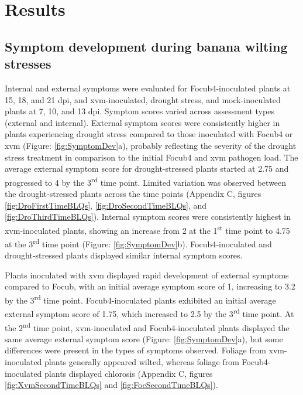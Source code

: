 \newpage
\section{Results}

\subsection{Symptom development during banana wilting stresses}

Internal and external symptoms were evaluated for \ac{Focub4}-inoculated plants at 15, 18, and 21 \ac{dpi}, and \ac{xvm}-inoculated, drought stress, and mock-inoculated plants at 7, 10, and 13 \ac{dpi}. Symptom scores varied across assessment types (external and internal). External symptom scores were consistently higher in plants experiencing drought stress compared to those inoculated with \ac{Focub4} or \ac{xvm} (Figure: \ref{fig:SymptomDev}a), probably reflecting the severity of the drought stress treatment in comparison to the initial \ac{Focub4} and \ac{xvm} pathogen load. The average external symptom score for drought-stressed plants started at 2.75 and progressed to 4 by the 3\textsuperscript{rd} time point. Limited variation was observed between the drought-stressed plants across the time points (Appendix C, figures \ref{fig:DroFirstTimeBLQs}, \ref{fig:DroSecondTimeBLQs}, and \ref{fig:DroThirdTimeBLQs}). Internal symptom scores were consistently highest in \ac{xvm}-inoculated plants, showing an increase from 2 at the 1\textsuperscript{st} time point to 4.75 at the 3\textsuperscript{rd} time point (Figure: \ref{fig:SymptomDev}b). \Ac{Focub4}-inoculated and drought-stressed plants displayed similar internal symptom scores.

Plants inoculated with \ac{xvm} displayed rapid development of external symptoms compared to \ac{Focub}, with an initial average symptom score of 1, increasing to 3.2 by the 3\textsuperscript{rd} time point. \ac{Focub4}-inoculated plants exhibited an initial average external symptom score of 1.75, which increased to 2.5 by the 3\textsuperscript{rd} time point. At the 2\textsuperscript{nd} time point, \ac{xvm}-inoculated and \ac{Focub4}-inoculated plants displayed the same average external symptom score (Figure: \ref{fig:SymptomDev}a), but some differences were present in the types of symptoms observed. Foliage from \ac{xvm}-inoculated plants generally appeared wilted, whereas foliage from \ac{Focub4}-inoculated plants displayed chlorosis (Appendix C, figures \ref{fig:XvmSecondTimeBLQs} and \ref{fig:FocSecondTimeBLQs}).

